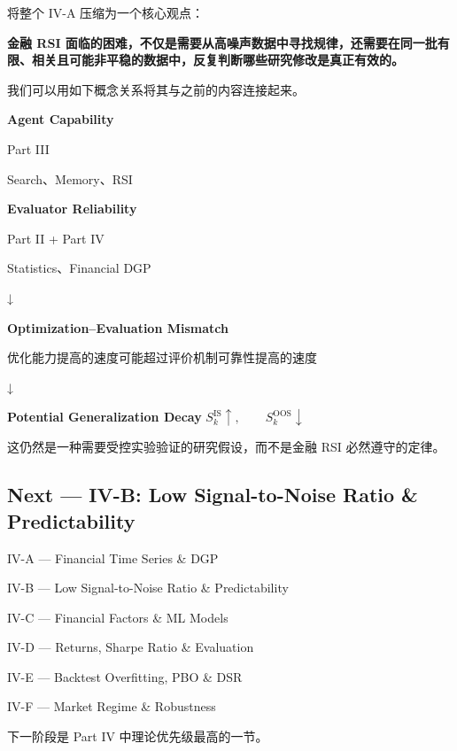 将整个 IV-A 压缩为一个核心观点：

\textbf{金融 RSI 面临的困难，不仅是需要从高噪声数据中寻找规律，还需要在同一批有限、相关且可能非平稳的数据中，反复判断哪些研究修改是真正有效的。}

我们可以用如下概念关系将其与之前的内容连接起来。

\textbf{Agent Capability}

Part III

Search、Memory、RSI

\textbf{Evaluator Reliability}

Part II + Part IV

Statistics、Financial DGP

↓

\textbf{Optimization--Evaluation Mismatch}

优化能力提高的速度可能超过评价机制可靠性提高的速度

↓

\textbf{Potential Generalization Decay} \(S_k^{\mathrm{IS}}\uparrow,\qquad S_k^{\mathrm{OOS}}\downarrow\)

这仍然是一种需要受控实验验证的研究假设，而不是金融 RSI 必然遵守的定律。

\hypertarget{part-4-58-0007-next-iv-b-low-signal-to-noise-ratio-predictability}{%
\subsection{Next --- IV-B: Low Signal-to-Noise Ratio \& Predictability}\label{part-4-58-0007-next-iv-b-low-signal-to-noise-ratio-predictability}}

IV-A --- Financial Time Series \& DGP

IV-B --- Low Signal-to-Noise Ratio \& Predictability

IV-C --- Financial Factors \& ML Models

IV-D --- Returns, Sharpe Ratio \& Evaluation

IV-E --- Backtest Overfitting, PBO \& DSR

IV-F --- Market Regime \& Robustness

下一阶段是 Part IV 中理论优先级最高的一节。

